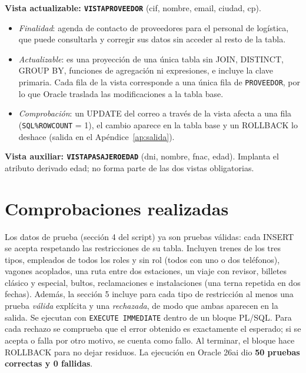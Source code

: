 \documentclass[11pt,a4paper]{article}
\DeclareRobustCommand{\_}{\textunderscore\allowbreak}
\newcommand{\tb}[1]{\texttt{#1}}
\begin{document}
\textbf{Vista actualizable: \tb{VISTA\_PROVEEDOR}} (cif, nombre, email, ciudad, cp).
\begin{itemize}
\item \emph{Finalidad}: agenda de contacto de proveedores para el personal de logística, que puede consultarla y corregir sus datos sin acceder al resto de la tabla.
\item \emph{Actualizable}: es una proyección de una única tabla sin JOIN, DISTINCT, GROUP BY, funciones de agregación ni expresiones, e incluye la clave primaria. Cada fila de la vista corresponde a una única fila de \tb{PROVEEDOR}, por lo que Oracle traslada las modificaciones a la tabla base.
\item \emph{Comprobación}: un UPDATE del correo a través de la vista afecta a una fila (\tb{SQL\%ROWCOUNT} = 1), el cambio aparece en la tabla base y un ROLLBACK lo deshace (salida en el Apéndice~\ref{ap:salida}).
\end{itemize}

\textbf{Vista auxiliar: \tb{VISTA\_PASAJERO\_EDAD}} (dni, nombre, f\_nac, edad). Implanta el atributo derivado edad; no forma parte de las dos vistas obligatorias.

\section{Comprobaciones realizadas}
\label{sec:pruebas}
Los datos de prueba (sección 4 del script) ya son pruebas válidas: cada INSERT se acepta respetando las restricciones de su tabla. Incluyen trenes de los tres tipos, empleados de todos los roles y sin rol (todos con uno o dos teléfonos), vagones acoplados, una ruta entre dos estaciones, un viaje con revisor, billetes clásico y especial, bultos, reclamaciones e instalaciones (una terna repetida en dos fechas). Además, la sección 5 incluye para cada tipo de restricción al menos una prueba \emph{válida} explícita y una \emph{rechazada}, de modo que ambas aparecen en la salida. Se ejecutan con \tb{EXECUTE IMMEDIATE} dentro de un bloque PL/SQL. Para cada rechazo se comprueba que el error obtenido es exactamente el esperado; si se acepta o falla por otro motivo, se cuenta como fallo. Al terminar, el bloque hace ROLLBACK para no dejar residuos. La ejecución en Oracle 26ai dio \textbf{50 pruebas correctas y 0 fallidas}.
\end{document}
